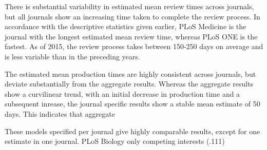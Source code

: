 There is substantial variability in estimated mean review times across journals, but all journals show an increasing time taken to complete the review process. In accordance with the descriptive statistics given earlier, PLoS Medicine is the journal with the longest estimated mean review time, whereas PLoS ONE is the fastest. As of 2015, the review process takes between 150-250 days on average and is less variable than in the preceding years.

The estimated mean production times are highly consistent across journals, but deviate substantially from the aggregate results. Whereas the aggregate results show a curvilinear trend, with an initial decrease in production time and a subsequent inrease, the journal specific results show a stable mean estimate of 50 days. This indicates that aggregate 

These models specified per journal give highly comparable results, except for one estimate in one journal. PLoS Biology only competing interests (.111)